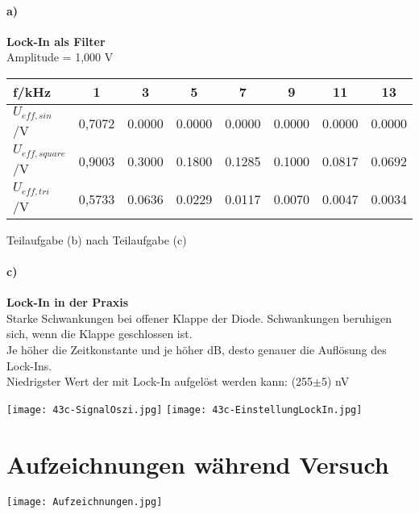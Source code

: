 \paragraph{a)}\textbf{Lock-In als Filter}\\
Amplitude = 1,000 V
\begin{center}
    \begin{tabular}{l | c c c c c c c}
        f/kHz               & 1 & 3 & 5 & 7 & 9 & 11 & 13 \\
        \hline
        $U_{eff,sin}$/V     & 0,7072 & 0.0000 & 0.0000 & 0.0000 & 0.0000 & 0.0000 & 0.0000 \\
        $U_{eff,square}$/V  & 0,9003 & 0.3000 & 0.1800 & 0.1285 & 0.1000 & 0.0817 & 0.0692 \\
        $U_{eff,tri}$/V     & 0,5733 & 0.0636 & 0.0229 & 0.0117 & 0.0070 & 0.0047 & 0.0034 \\
    \end{tabular}
\end{center}
Teilaufgabe (b) nach Teilaufgabe (c)
\paragraph{c)}\textbf{Lock-In in der Praxis}\\
Starke Schwankungen bei offener Klappe der Diode. Schwankungen beruhigen sich, wenn die Klappe geschlossen ist.\\
Je höher die Zeitkonstante und je höher dB, desto genauer die Auflösung des Lock-Ins.\\
Niedrigster Wert der mit Lock-In aufgelöst werden kann: (255$\pm$5) nV
\begin{center}
    \texttt{[image: 43c-SignalOszi.jpg]}
    \label{image:oszi}
    \texttt{[image: 43c-EinstellungLockIn.jpg]}
    \label{image:lockIn}
\end{center}
\section*{Aufzeichnungen während Versuch}
\begin{center}
    \texttt{[image: Aufzeichnungen.jpg]}
    \label{image:aufzeichnungen}
\end{center}
\newpage
